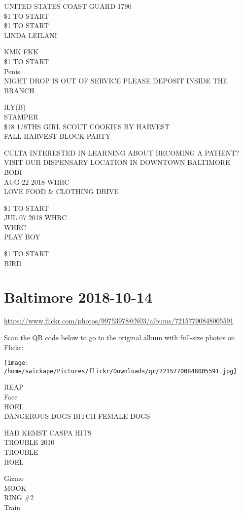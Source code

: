 \documentclass[10pt,letterpaper]{article}
\begin{document}
UNITED STATES COAST GUARD 1790\\
\$1 TO START\\
\$1 TO START\\
LINDA LEILANI

KMK FKK\\
\$1 TO START\\
Penis\\
NIGHT DROP IS OUT OF SERVICE PLEASE DEPOSIT INSIDE THE BRANCH

ILY(B)\\
STAMPER\\
\$18 1/8THS GIRL SCOUT COOKIES BY HARVEST\\
FALL HARVEST BLOCK PARTY

CULTA INTERESTED IN LEARNING ABOUT BECOMING A PATIENT?  VISIT OUR DISPENSARY LOCATION IN DOWNTOWN BALTIMORE\\
BODI\\
AUG 22 2018 WHRC\\
LOVE FOOD \& CLOTHING DRIVE

\$1 TO START\\
JUL 07 2018 WHRC\\
WHRC\\
PLAY BOY

\$1 TO START\\
BIRD


\section*{Baltimore 2018-10-14}

\url{https://www.flickr.com/photos/99753978@N03/albums/72157700848005591}

Scan the QR code below to go to the original album with full-size photos on Flickr:

\texttt{[image: /home/swickape/Pictures/flickr/Downloads/qr/72157700848005591.jpg]}


REAP\\
Face\\
HOEL\\
DANGEROUS DOGS BITCH FEMALE DOGS

HAD KEMST CASPA HITS\\
TROUBLE 2010\\
TROUBLE\\
HOEL

Gizmo\\
MOOK\\
RING \#2\\
Train
\end{document}
